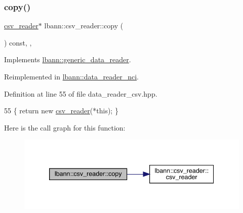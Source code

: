 \subsubsection{\texorpdfstring{copy()}{copy()}}
{\footnotesize\ttfamily \hyperlink{classlbann_1_1csv__reader}{csv\+\_\+reader}$\ast$ lbann\+::csv\+\_\+reader\+::copy (\begin{DoxyParamCaption}{ }\end{DoxyParamCaption}) const\hspace{0.3cm}{\ttfamily [inline]}, {\ttfamily [override]}, {\ttfamily [virtual]}}



Implements \hyperlink{classlbann_1_1generic__data__reader_a208ba1223e7aaa75e94b728501f12f86}{lbann\+::generic\+\_\+data\+\_\+reader}.



Reimplemented in \hyperlink{classlbann_1_1data__reader__nci_a642f96edf3efae0d5d0aad70d8a17dbe}{lbann\+::data\+\_\+reader\+\_\+nci}.



Definition at line 55 of file data\+\_\+reader\+\_\+csv.\+hpp.


\begin{DoxyCode}
55 \{ \textcolor{keywordflow}{return} \textcolor{keyword}{new} \hyperlink{classlbann_1_1csv__reader_ac301a4c8e2ef029b65e8f6b8cbbc5855}{csv\_reader}(*\textcolor{keyword}{this}); \}
\end{DoxyCode}
Here is the call graph for this function\+:\nopagebreak
\begin{figure}[H]
\begin{center}
\leavevmode
\includegraphics[width=339pt]{classlbann_1_1csv__reader_a6a45ad54bb7f2b30722d70ea8921243d_cgraph}
\end{center}
\end{figure}
\mbox{\label{classlbann_1_1csv__reader_ad69e57123eba2002a693aedb87dc14f3}} 
